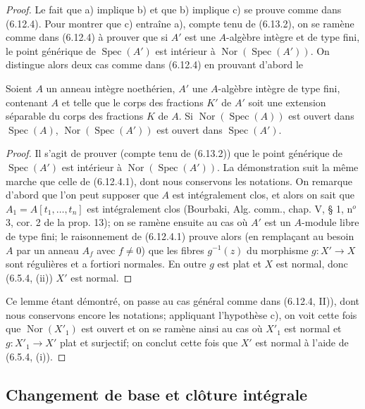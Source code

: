 \begin{proof}
Le fait que a) implique b) et que b) implique c) se prouve comme dans
(6.12.4). Pour montrer que c) entraîne a), compte tenu de (6.13.2), on se
ramène comme dans (6.12.4) à prouver que si $A'$ est une $A$-algèbre intègre
et de type fini, le point générique de $\operatorname{Spec}(A')$ est
intérieur à $\operatorname{Nor}(\operatorname{Spec}(A'))$. On distingue
alors deux cas comme dans (6.12.4) en prouvant d'abord le

\begin{lemma}[6.13.7.1]
\label{IV.2.s6.13.7.1-fr}
Soient $A$ un anneau intègre noethérien, $A'$ une $A$-algèbre intègre de
type fini, contenant $A$ et telle que le corps des fractions $K'$ de $A'$
soit une extension séparable du corps des fractions $K$ de $A$. Si
$\operatorname{Nor}(\operatorname{Spec}(A))$ est ouvert dans
$\operatorname{Spec}(A)$, $\operatorname{Nor}(\operatorname{Spec}(A'))$ est
ouvert dans $\operatorname{Spec}(A')$.
\end{lemma}

\begin{proof}
Il s'agit de prouver (compte tenu de (6.13.2)) que le point générique de
$\operatorname{Spec}(A')$ est intérieur à
$\operatorname{Nor}(\operatorname{Spec}(A'))$. La démonstration suit la
même marche que celle de (6.12.4.1), dont nous conservons les notations. On
remarque d'abord que l'on peut supposer que $A$ est intégralement clos, et
alors on sait que $A_1=A[t_1,\ldots,t_n]$ est intégralement clos (Bourbaki,
Alg. comm., chap. V, § 1, n$^o$ 3, cor. 2 de la prop. 13); on se ramène
ensuite au cas où $A'$ est un $A$-module libre de type fini; le raisonnement
de (6.12.4.1) prouve alors (en remplaçant au besoin $A$ par un anneau $A_f$
avec $f\neq0$) que les fibres $g^{-1}(z)$ du morphisme $g:X'\to X$ sont
régulières et a fortiori normales. En outre $g$ est plat et $X$ est normal,
donc (6.5.4, (ii)) $X'$ est normal.
\end{proof}

Ce lemme étant démontré, on passe au cas général comme dans (6.12.4, II)),
dont nous conservons encore les notations; appliquant l'hypothèse c), on
voit cette fois que $\operatorname{Nor}(X'_1)$ est ouvert et on se ramène
ainsi au cas où $X'_1$ est normal et $g:X'_1\to X'$ plat et surjectif; on
conclut cette fois que $X'$ est normal à l'aide de (6.5.4, (i)).
\end{proof}

\subsection{Changement de base et clôture intégrale}
\label{IV.2.s6.14-fr}

